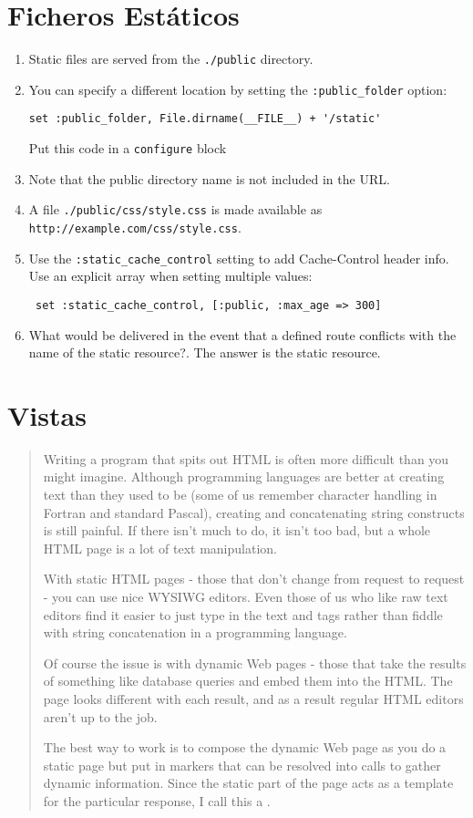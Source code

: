 \section{Ficheros Estáticos}
\begin{enumerate}
\item 
Static files are served from the \verb|./public| directory. 
\item 
You can specify a different location by setting the \verb|:public_folder| option:
\begin{verbatim}
set :public_folder, File.dirname(__FILE__) + '/static'
\end{verbatim}
Put this code in a \verb|configure| block
\item 
Note that the public directory name is not included in the URL. 
\item 
A file \verb|./public/css/style.css| is made available as \verb|http://example.com/css/style.css|.
\item 
Use the \verb|:static_cache_control| setting to add Cache-Control header info.
Use an explicit array when setting multiple values:
\begin{verbatim}
 set :static_cache_control, [:public, :max_age => 300]
\end{verbatim}
\item 
What would be delivered in the event that a defined route conflicts with the name of the static resource?.
The answer is the static resource.
\end{enumerate}

\section{Vistas}

\begin{quote}
Writing a program that spits out HTML is often more difficult than
you might imagine. Although programming languages are better at
creating text than they used to be (some of us remember character
handling in Fortran and standard Pascal), creating and concatenating
string constructs is still painful. If there isn't much to do, it
isn't too bad, but a whole HTML page is a lot of text manipulation.

With static HTML pages - those that don't change from request to
request - you can use nice WYSIWG editors. Even those of us who
like raw text editors find it easier to just type in the text and
tags rather than fiddle with string concatenation in a programming
language.

Of course the issue is with dynamic Web pages - those that take the
results of something like database queries and embed them into the
HTML. The page looks different with each result, and as a result
regular HTML editors aren't up to the job.

The best way to work is to compose the dynamic Web page as you do
a static page but put in markers that can be resolved into calls
to gather dynamic information. Since the static part of the page
acts as a template for the particular response, I call this a
.


\end{quote}

